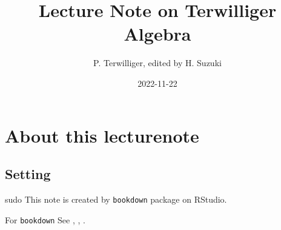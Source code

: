 \documentclass[
]{book}
\title{Lecture Note on Terwilliger Algebra}
\author{P. Terwilliger, edited by H. Suzuki}
\date{2022-11-22}
\theoremstyle{definition}
\theoremstyle{definition}
\theoremstyle{definition}
\theoremstyle{definition}
\theoremstyle{remark}
\begin{document}
\maketitle

{
\setcounter{tocdepth}{1}
\tableofcontents
}
\hypertarget{about-this-lecturenote}{%
\chapter*{About this lecturenote}\label{about-this-lecturenote}}

\hypertarget{setting}{%
\section*{Setting}\label{setting}}

sudo
This note is created by \texttt{bookdown} package on RStudio.

For \texttt{bookdown} See \citep{xie2015}, \citep{xie2017}, \citep{xie2018}.
\end{document}
